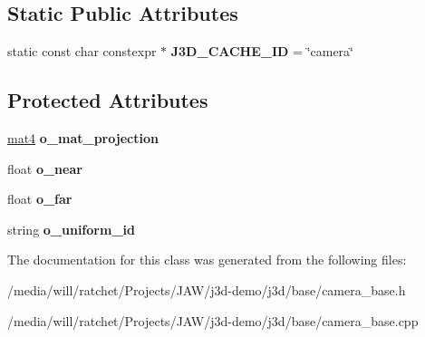 \subsection*{Static Public Attributes}
\begin{DoxyCompactItemize}
\item 
\hypertarget{classj3d_1_1base_1_1CameraBase_ac22a6ffdaa7b3b764b04df74a709e1c0}{}static const char constexpr $\ast$ {\bfseries J3\+D\+\_\+\+C\+A\+C\+H\+E\+\_\+\+I\+D} = \char`\"{}camera\char`\"{}\label{classj3d_1_1base_1_1CameraBase_ac22a6ffdaa7b3b764b04df74a709e1c0}

\end{DoxyCompactItemize}
\subsection*{Protected Attributes}
\begin{DoxyCompactItemize}
\item 
\hypertarget{classj3d_1_1base_1_1CameraBase_a23d168f7ff1a3574265f327b9f6db632}{}\hyperlink{structj3d_1_1mat4}{mat4} {\bfseries o\+\_\+mat\+\_\+projection}\label{classj3d_1_1base_1_1CameraBase_a23d168f7ff1a3574265f327b9f6db632}

\item 
\hypertarget{classj3d_1_1base_1_1CameraBase_a80964876077f13e779d762015b3f0b93}{}float {\bfseries o\+\_\+near}\label{classj3d_1_1base_1_1CameraBase_a80964876077f13e779d762015b3f0b93}

\item 
\hypertarget{classj3d_1_1base_1_1CameraBase_ae0a16fcd9438bca468226f3e6d1b3022}{}float {\bfseries o\+\_\+far}\label{classj3d_1_1base_1_1CameraBase_ae0a16fcd9438bca468226f3e6d1b3022}

\item 
\hypertarget{classj3d_1_1base_1_1CameraBase_a444f7e015d1e3ddba872796bc664957a}{}string {\bfseries o\+\_\+uniform\+\_\+id}\label{classj3d_1_1base_1_1CameraBase_a444f7e015d1e3ddba872796bc664957a}

\end{DoxyCompactItemize}


The documentation for this class was generated from the following files\+:\begin{DoxyCompactItemize}
\item 
/media/will/ratchet/\+Projects/\+J\+A\+W/j3d-\/demo/j3d/base/camera\+\_\+base.\+h\item 
/media/will/ratchet/\+Projects/\+J\+A\+W/j3d-\/demo/j3d/base/camera\+\_\+base.\+cpp\end{DoxyCompactItemize}
